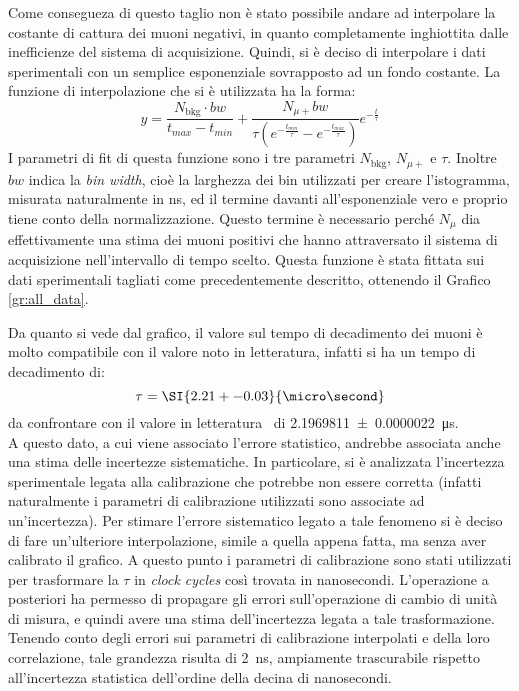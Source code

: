 Come consegueza di questo taglio non è stato possibile andare ad interpolare la costante di cattura dei muoni negativi, in quanto completamente inghiottita dalle inefficienze del sistema di acquisizione. 
Quindi, si è deciso di interpolare i dati sperimentali con un semplice esponenziale sovrapposto ad un fondo costante. La funzione di interpolazione che si è utilizzata ha la forma:
\begin{equation}
  y = \frac{N_\text{bkg} \cdot bw}{t_\textit{max}-t_\textit{min}}+\frac{N_{\mu+}bw}{\tau \left(e^{-\frac{t_\textit{min}}{\tau}} - e^{-\frac{t_\textit{max}}{\tau}}\right)}
  e^{-\frac{t}{\tau}} 
  \label{eq:fit_mean_life}
\end{equation}
I parametri di fit di questa funzione sono i tre parametri $N_\text{bkg}$, $N_{\mu+}$ e $\tau$. 
Inoltre $bw$ indica la \textit{bin width}, cioè la larghezza dei bin utilizzati per creare l'istogramma, misurata naturalmente in ns, ed il termine davanti all'esponenziale vero e proprio tiene conto della normalizzazione. 
Questo termine è necessario perché $N_\mu$ dia effettivamente una stima dei muoni positivi che hanno attraversato il sistema di acquisizione nell'intervallo di tempo scelto. Questa funzione è stata fittata sui dati sperimentali tagliati come precedentemente descritto, ottenendo il Grafico \ref{gr:all_data}.\\

Da quanto si vede dal grafico, il valore sul tempo di decadimento dei muoni è molto compatibile con il valore noto in  letteratura, infatti si ha un tempo di decadimento di:
\begin{equation}
  \tau = \SI{2.21+-0.03}{\micro\second}
\end{equation}
da confrontare con il valore in letteratura~\cite{bib:Patrignani:2016xqp} di \SI{2.1969811+-0.0000022}{\micro\second}.\\

A questo dato, a cui viene associato l'errore statistico, andrebbe associata anche una stima delle incertezze sistematiche. 
In particolare, si è analizzata l'incertezza sperimentale legata alla calibrazione che potrebbe non essere corretta (infatti naturalmente i parametri di calibrazione utilizzati sono associate ad un'incertezza). 
Per  stimare l'errore sistematico legato a tale fenomeno si è deciso di fare un'ulteriore interpolazione, simile a quella appena fatta, ma senza aver calibrato il  grafico. 
A questo punto i parametri di calibrazione sono stati utilizzati per trasformare la $\tau$ in \textit{clock cycles} così trovata in nanosecondi. 
L'operazione a posteriori ha permesso di propagare gli errori sull'operazione di cambio di unità di misura, e quindi avere una stima dell'incertezza legata a tale trasformazione.
Tenendo conto degli errori sui parametri di calibrazione interpolati e della loro correlazione, tale grandezza risulta di \SI{2}{\ns}, ampiamente trascurabile rispetto all'incertezza statistica dell'ordine della decina di nanosecondi.


